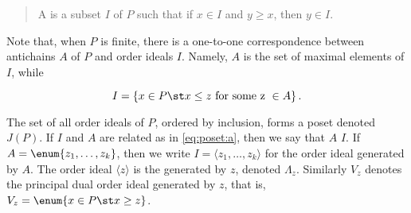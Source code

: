 \begin{quotation}
A  is a subset $I$ of $P$ such that if $x \in I$
and $y \ge x$, then $y \in I$.
\end{quotation}

Note that, when $P$ is finite, there is a one-to-one correspondence between
antichains $A$ of $P$ and order ideals $I$. Namely, $A$ is the set of maximal
elements of $I$, while

\begin{equation}
\label{eq:poset:a}
I = \left\{{x \in P \st x \le z ~\text{for some z}~ \in A}\right\}.
\end{equation}

The set of all order ideals of $P$, ordered by inclusion, forms a poset denoted
$J(P)$. If $I$ and $A$ are related as in \ref{eq:poset:a}, then we say that $A$
 $I$. If $A = \enum{z_1 , \ldots , z_k}$, then we
write $I = \langle z_1 , \ldots , z_k \rangle$ for the order ideal generated by
$A$. The order ideal $\langle z \rangle$ is the 
generated by $z$, denoted $\Lambda_z$. Similarly $V_z$ denotes the principal
dual order ideal generated by $z$, that is, $V_z = \enum{x \in P \st x \ge
z}$.

